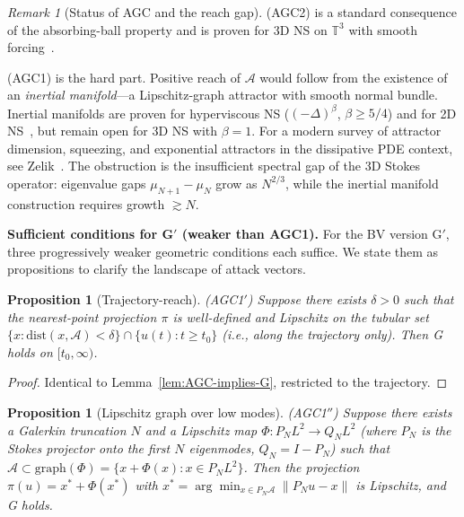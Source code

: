 \documentclass[12pt,a4paper]{article}
\theoremstyle{definition}
\theoremstyle{plain}
\newtheorem{proposition}[definition]{Proposition}
\theoremstyle{remark}
\newtheorem{remark}[definition]{Remark}
\begin{document}
\begin{remark}[Status of AGC and the reach gap]
\label{rem:AGC-status}
\textup{(AGC2)} is a standard consequence of the absorbing-ball property
and is proven for 3D NS on $\mathbb{T}^3$ with smooth
forcing~\cite{Temam2001}.

\textup{(AGC1)} is the hard part.
Positive reach of $\mathcal{A}$ would follow from the existence of an
\emph{inertial manifold}---a Lipschitz-graph attractor with smooth
normal bundle. Inertial manifolds are proven for hyperviscous NS
($(-\Delta)^\beta$, $\beta \ge 5/4$) and for 2D
NS~\cite{MalletParetSell1988,EdenFoiasNicolaenko1994}, but remain open for 3D NS with $\beta=1$.
For a modern survey of attractor dimension, squeezing, and exponential
attractors in the dissipative PDE context, see Zelik~\cite{Zelik2022}.
The obstruction is the insufficient spectral gap of the 3D Stokes
operator: eigenvalue gaps $\mu_{N+1} - \mu_N$ grow as $N^{2/3}$, while
the inertial manifold construction requires growth $\gtrsim N$.

\medskip\noindent
\textbf{Sufficient conditions for G$'$ (weaker than AGC1).}\;
For the BV version G$'$, three progressively weaker geometric
conditions each suffice. We state them as propositions to clarify
the landscape of attack vectors.

\begin{proposition}[Trajectory-reach]\label{prop:traj-reach}
\textup{(AGC1$'$)}\;
Suppose there exists $\delta > 0$ such that the nearest-point
projection $\pi$ is well-defined and Lipschitz on the tubular set
$\{x : \mathrm{dist}(x, \mathcal{A}) < \delta\}
\cap \{u(t) : t \ge t_0\}$
\textup{(}i.e., along the trajectory only\textup{)}. Then G holds
on $[t_0, \infty)$.
\end{proposition}

\begin{proof}
Identical to Lemma~\ref{lem:AGC-implies-G}, restricted to the
trajectory.
\end{proof}

\begin{proposition}[Lipschitz graph over low modes]\label{prop:graph}
\textup{(AGC1$''$)}\;
Suppose there exists a Galerkin truncation $N$ and a Lipschitz map
$\Phi : P_N L^2 \to Q_N L^2$ (where $P_N$ is the Stokes projector
onto the first $N$ eigenmodes, $Q_N = I - P_N$) such that
$\mathcal{A} \subset \mathrm{graph}(\Phi) =
\{x + \Phi(x) : x \in P_N L^2\}$.
Then the projection $\pi(u) = x^* + \Phi(x^*)$ with
$x^* = \arg\min_{x \in P_N\mathcal{A}} \|P_N u - x\|$ is Lipschitz,
and G holds.
\end{proposition}


\end{remark}
\end{document}
